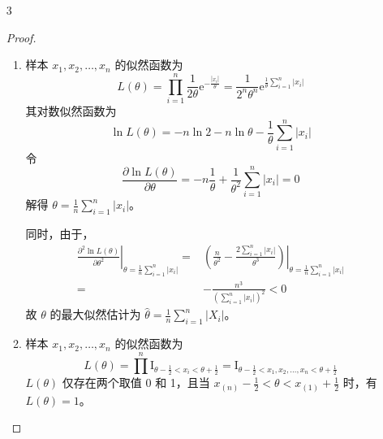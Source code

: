 \documentclass[normal,cn]{elegantnote}
\begin{document}
\begin{enumerate}
\begin{proof}
\begin{enumerate}
                      故 $\theta$ 的最大似然估计为 $\hat{\theta}=\frac{X_{(n)}}{k+1}$。
            \end{enumerate}
        \end{proof}
    \item[3]
        \begin{proof}
            \begin{enumerate}
                \item
                      样本 $x_{1},x_{2},\ldots,x_{n}$ 的似然函数为
                      \begin{equation*}
                          L(\theta)=\prod_{i=1}^{n}\frac{1}{2\theta}\mathrm{e}^{-\frac{|x_{i}|}{\theta}}=\frac{1}{2^{n}\theta^{n}}\mathrm{e}^{\frac{1}{\theta}\sum_{i=1}^{n}\left|x_{i}\right|}
                      \end{equation*}
                      其对数似然函数为
                      \begin{equation*}
                          \ln L(\theta)=-n\ln 2-n\ln\theta-\frac{1}{\theta}\sum_{i=1}^{n}|x_{i}|
                      \end{equation*}
                      令
                      \begin{equation*}
                          \frac{\partial\ln L(\theta)}{\partial\theta}=-n\frac{1}{\theta}+\frac{1}{\theta^{2}}\sum_{i=1}^{n}|x_{i}|=0
                      \end{equation*}
                      解得 $\theta=\frac{1}{n}\sum_{i=1}^{n}|x_{i}|$。

                      同时，由于，
                      \begin{equation*}
                          \begin{aligned}
                              \left.\frac{\partial^{2}\ln L(\theta)}{\partial\theta^{2}}\right|_{\theta=\frac{1}{n}\sum_{i=1}^{n}|x_{i}|}= & \left.\left(\frac{n}{\theta^{2}}-\frac{2\sum_{i=1}^{n}|x_{i}|}{\theta^{3}}\right)\right|_{\theta=\frac{1}{n}\sum_{i=1}^{n}|x_{i}|} \\
                              =                                                                                                            & -\frac{n^{3}}{\left(\sum_{i=1}^{n}|x_{i}|\right)^{2}}<0
                          \end{aligned}
                      \end{equation*}
                      故 $\theta$ 的最大似然估计为 $\hat{\theta}=\frac{1}{n} \sum_{i=1}^{n}\left|X_{i}\right|$。
                \item
                      样本 $x_{1},x_{2},\ldots,x_{n}$ 的似然函数为
                      \begin{equation*}
                          L(\theta)=\prod^{n}\mathrm{I}_{\theta-\frac{1}{2}<x_{i}<\theta+\frac{1}{2}}=\mathrm{I}_{\theta-\frac{1}{2}<x_{1},x_{2},\ldots,x_{n}<\theta+\frac{1}{2}}
                      \end{equation*}
                      $L(\theta)$ 仅存在两个取值 0 和 1，且当 $x_{(n)}-\frac{1}{2}<\theta<x_{(1)}+\frac{1}{2}$ 时，有 $L(\theta)=1$。


\end{enumerate}
\end{proof}
\end{enumerate}
\end{document}
